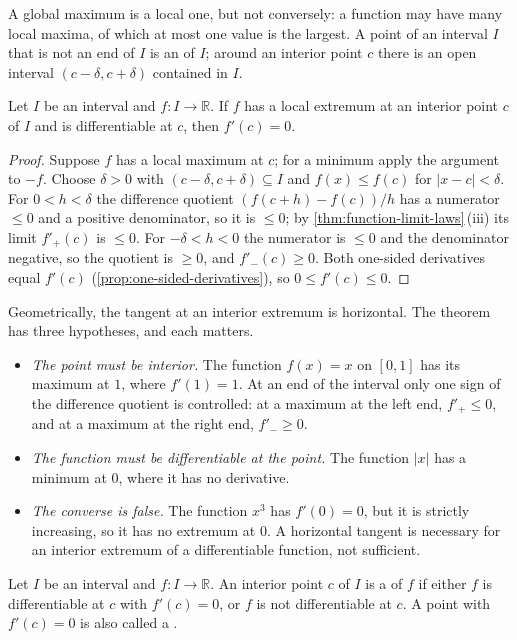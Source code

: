 A global maximum is a local one, but not conversely: a function may have many local maxima, of which at most one value is the largest. A point of an interval $I$ that is not an end of $I$ is an  of $I$; around an interior point $c$ there is an open interval $(c-\delta,c+\delta)$ contained in $I$.

\begin{theorem}[Fermat]
\label{thm:fermat-extremum}
Let $I$ be an interval and $f\colon I\to\mathbb R$. If $f$ has a local extremum at an interior point $c$ of $I$ and is differentiable at $c$, then $f'(c)=0$.
\end{theorem}

\begin{proof}
Suppose $f$ has a local maximum at $c$; for a minimum apply the argument to $-f$. Choose $\delta>0$ with $(c-\delta,c+\delta)\subseteq I$ and $f(x)\le f(c)$ for $|x-c|<\delta$. For $0<h<\delta$ the difference quotient $(f(c+h)-f(c))/h$ has a numerator $\le0$ and a positive denominator, so it is $\le0$; by \cref{thm:function-limit-laws}\,(iii) its limit $f'_+(c)$ is $\le0$. For $-\delta<h<0$ the numerator is $\le0$ and the denominator negative, so the quotient is $\ge0$, and $f'_-(c)\ge0$. Both one-sided derivatives equal $f'(c)$ (\cref{prop:one-sided-derivatives}), so $0\le f'(c)\le0$.
\end{proof}

Geometrically, the tangent at an interior extremum is horizontal. The theorem has three hypotheses, and each matters.
\begin{itemize}
\item \emph{The point must be interior.} The function $f(x)=x$ on $[0,1]$ has its maximum at $1$, where $f'(1)=1$. At an end of the interval only one sign of the difference quotient is controlled: at a maximum at the left end, $f'_+\le0$, and at a maximum at the right end, $f'_-\ge0$.
\item \emph{The function must be differentiable at the point.} The function $|x|$ has a minimum at $0$, where it has no derivative.
\item \emph{The converse is false.} The function $x^3$ has $f'(0)=0$, but it is strictly increasing, so it has no extremum at $0$. A horizontal tangent is necessary for an interior extremum of a differentiable function, not sufficient.
\end{itemize}

\begin{definition}
\label{def:critical}
Let $I$ be an interval and $f\colon I\to\mathbb R$. An interior point $c$ of $I$ is a  of $f$ if either $f$ is differentiable at $c$ with $f'(c)=0$, or $f$ is not differentiable at $c$. A point with $f'(c)=0$ is also called a .
\end{definition}

